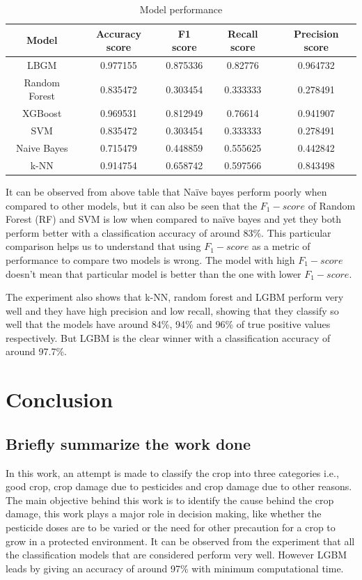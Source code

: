 \documentclass[12pt]{article}
\begin{document}
\begin{table}[ht]
\centering

\caption{Model performance}
\begin{tabular}{|c|c|c|c|c|}
\hline 
Model & Accuracy score & F1 score & Recall score & Precision score \\ 
\hline 
LBGM & 0.977155 & 0.875336 & 0.82776 & 0.964732 \\ 
\hline 
Random Forest & 0.835472 & 0.303454 & 0.333333 & 0.278491 \\ 
\hline 
XGBoost & 0.969531 & 0.812949 & 0.76614 & 0.941907 \\ 
\hline 
SVM & 0.835472 & 0.303454 & 0.333333 & 0.278491  \\ 
\hline 
Naive Bayes & 0.715479 & 0.448859 &	0.555625 & 0.442842 \\ 
\hline 
k-NN & 0.914754	& 0.658742	& 0.597566 & 0.843498 \\ 
\hline 
\end{tabular} 
\label{tab:caption}
\end{table}

 It can be observed from above table that Naïve bayes perform poorly when compared to other models, but it can also be seen that the $F_1-score$ of Random Forest (RF) and SVM is low when compared to naïve bayes and yet they both perform better with a classification accuracy of around 83\%. This particular comparison helps us to understand that using $F_1-score$ as a metric of performance to compare two models is wrong. The model with high $F_1-score$ doesn't mean that particular model is better than the one with lower $F_1-score$. 
 
The experiment also shows that k-NN, random forest and LGBM perform very well and they have high precision and low recall, showing that they classify so well that the models have around 84\%, 94\% and 96\% of true positive values respectively. But LGBM is the clear winner with a classification accuracy of around 97.7\%.


\clearpage

	\section{Conclusion}
	\subsection{Briefly summarize the work done}
	In this work, an attempt is made to classify the crop into three categories i.e., good crop, crop damage due to pesticides and crop damage due to other reasons. The main objective behind this work is to identify the cause behind the crop damage, this work plays a major role in decision making, like whether the pesticide doses are to be varied or the need for other precaution for a crop to grow in a protected environment. It can be observed from the experiment that all the classification models that are considered perform very well. However LGBM leads by giving an accuracy of around 97\% with minimum computational time.
	
\end{document}
